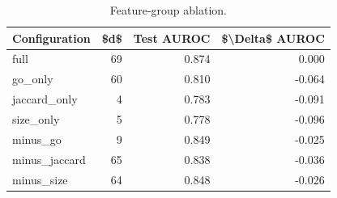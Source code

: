 \begin{table}[htbp]
\centering
\caption{Feature-group ablation.}
\label{tab:ablation_recomputed}
\begin{tabular}{lrrr}
\toprule
Configuration & \$d\$ & Test AUROC & \$\textbackslash Delta\$ AUROC \\
\midrule
full & 69 & 0.874 & 0.000 \\
go\_only & 60 & 0.810 & -0.064 \\
jaccard\_only & 4 & 0.783 & -0.091 \\
size\_only & 5 & 0.778 & -0.096 \\
minus\_go & 9 & 0.849 & -0.025 \\
minus\_jaccard & 65 & 0.838 & -0.036 \\
minus\_size & 64 & 0.848 & -0.026 \\
\bottomrule
\end{tabular}

\end{table}
